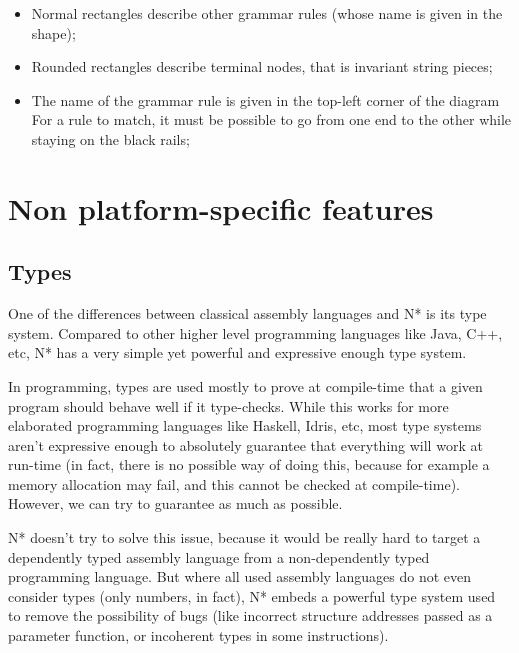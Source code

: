 \begin{itemize}
\begin{figure}[H]
{          }
        \end{figure}
        \begin{itemize}
          \item Normal rectangles describe other grammar rules (whose name is given in the shape);
          \item Rounded rectangles describe terminal nodes, that is invariant string pieces;
          \item The name of the grammar rule is given in the top-left corner of the diagram
                For a rule to match, it must be possible to go from one end to the other while staying on the black rails;
        \end{itemize}
\end{itemize}

\chapter{Non platform-specific features}\label{chap:nstar-common}

\section{Types}\label{sec:nstar-common-ts}

One of the differences between classical assembly languages and N* is its type system.
Compared to other higher level programming languages like Java, C++, etc, N* has a very simple yet powerful and expressive enough type system.

In programming, types are used mostly to prove at compile-time that a given program should behave well if it type-checks. While this works for more elaborated programming languages like Haskell, Idris, etc, most type systems aren't expressive enough to absolutely guarantee that everything will work at run-time (in fact, there is no possible way of doing this, because for example a memory allocation may fail, and this cannot be checked at compile-time). However, we can try to guarantee as much as possible.

N* doesn't try to solve this issue, because it would be really hard to target a dependently typed assembly language from a non-dependently typed programming language. But where all used assembly languages do not even consider types (only numbers, in fact), N* embeds a powerful type system used to remove the possibility of bugs (like incorrect structure addresses passed as a parameter function, or incoherent types in some instructions).

